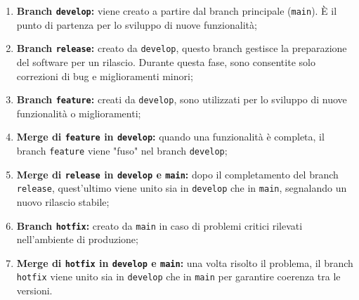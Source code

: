 \begin{enumerate}
    \item \textbf{Branch \texttt{develop}:} viene creato a partire dal branch principale (\texttt{main}). È il punto di partenza per lo sviluppo di nuove funzionalità;

    \item \textbf{Branch \texttt{release}:} creato da \texttt{develop}, questo branch gestisce la preparazione del software per un rilascio. Durante questa fase, sono consentite solo correzioni di bug e miglioramenti minori;

    \item \textbf{Branch \texttt{feature}:} creati da \texttt{develop}, sono utilizzati per lo sviluppo di nuove funzionalità o miglioramenti; 

    \item \textbf{Merge di \texttt{feature} in \texttt{develop}:} quando una funzionalità è completa, il branch \texttt{feature} viene "fuso" nel branch \texttt{develop};

    \item \textbf{Merge di \texttt{release} in \texttt{develop} e \texttt{main}:} dopo il completamento del branch \texttt{release}, quest'ultimo viene unito sia in \texttt{develop} che in \texttt{main}, segnalando un nuovo rilascio stabile;

    \item \textbf{Branch \texttt{hotfix}:} creato da \texttt{main} in caso di problemi critici rilevati nell'ambiente di produzione;

    \item \textbf{Merge di \texttt{hotfix} in \texttt{develop} e \texttt{main}:} una volta risolto il problema, il branch \texttt{hotfix} viene unito sia in \texttt{develop} che in \texttt{main} per garantire coerenza tra le versioni.
\end{enumerate}

